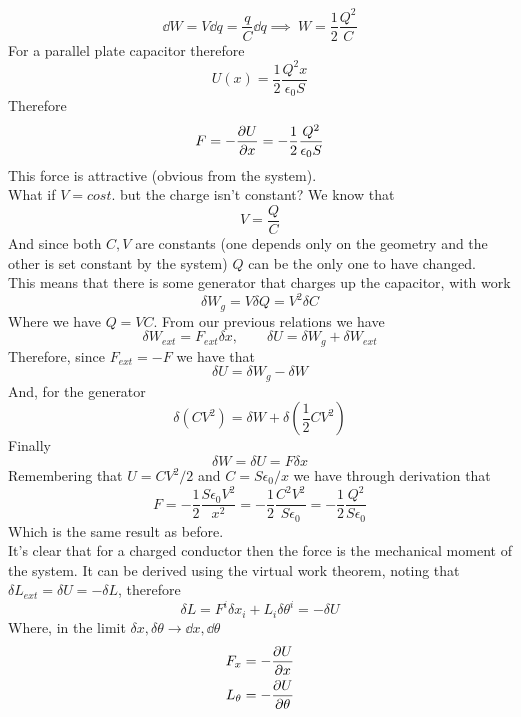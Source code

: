\documentclass[../electromagnetism]{subfiles}
\begin{document}
\begin{equation*}
	\dd W=V\dd q=\frac{q}{C}\dd q\implies\ W=\frac{1}{2}\frac{Q^2}{C}
\end{equation*}
For a parallel plate capacitor therefore
\begin{equation*}
	U(x)=\frac{1}{2}\frac{Q^2x}{\epsilon_0S}
\end{equation*}
Therefore
\begin{equation*}
	F=-\pdv{U}{x}=-\frac{1}{2}\frac{Q^2}{\epsilon_0S}
\end{equation*}
This force is attractive (obvious from the system).\\
What if $V=cost.$ but the charge isn't constant? We know that
\begin{equation*}
	V=\frac{Q}{C}
\end{equation*}
And since both $C,V$ are constants (one depends only on the geometry and the other is set constant by the system) $Q$ can be the only one to have changed.\\
This means that there is some generator that charges up the capacitor, with work
\begin{equation*}
	\delta W_g=V\delta Q=V^2\delta C
\end{equation*}
Where we have $Q=VC$. From our previous relations we have
\begin{equation*}
	\delta W_{ext}=F_{ext}\delta x,\qquad\delta U=\delta W_g+\delta W_{ext}
\end{equation*}
Therefore, since $F_{ext}=-F$ we have that
\begin{equation*}
	\delta U=\delta W_g-\delta W
\end{equation*}
And, for the generator
\begin{equation*}
	\delta(CV^2)=\delta W+\delta\left( \frac{1}{2}CV^2 \right)
\end{equation*}
Finally
\begin{equation*}
	\delta W=\delta U=F\delta x
\end{equation*}
Remembering that $U=CV^2/2$ and $C=S\epsilon_0/x$ we have through derivation that
\begin{equation*}
	F=-\frac{1}{2}\frac{S\epsilon_0 V^2}{x^2}=-\frac{1}{2}\frac{C^2V^2}{S\epsilon_0}=-\frac{1}{2}\frac{Q^2}{S\epsilon_0}
\end{equation*}
Which is the same result as before.\\
It's clear that for a charged conductor then the force is the mechanical moment of the system. It can be derived using the virtual work theorem, noting that $\delta L_{ext}=\delta U=-\delta L$, therefore
\begin{equation*}
	\delta L=F^i\delta{x_i}+L_i\delta{\theta^i}=-\delta U
\end{equation*}
Where, in the limit $\delta x,\delta \theta\to\dd x,\dd\theta$
\begin{equation*}
	\begin{aligned}
		F_x&=-\pdv{U}{x}\\
		L_\theta&=-\pdv{U}{\theta}
	\end{aligned}
\end{equation*}
\end{document}
